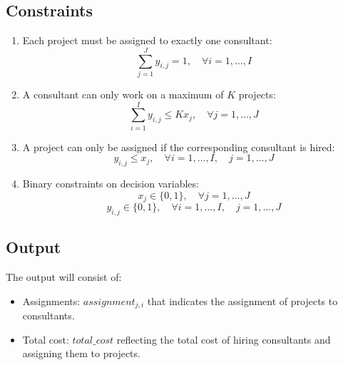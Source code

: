 \documentclass{article}
\begin{document}
\subsection*{Constraints}
\begin{enumerate}
    \item Each project must be assigned to exactly one consultant:
    \[
    \sum_{j=1}^{J} y_{i,j} = 1, \quad \forall i = 1, \ldots, I
    \]

    \item A consultant can only work on a maximum of $K$ projects:
    \[
    \sum_{i=1}^{I} y_{i,j} \leq K x_j, \quad \forall j = 1, \ldots, J
    \]

    \item A project can only be assigned if the corresponding consultant is hired:
    \[
    y_{i,j} \leq x_j, \quad \forall i = 1, \ldots, I, \quad j = 1, \ldots, J
    \]

    \item Binary constraints on decision variables:
    \[
    x_j \in \{0, 1\}, \quad \forall j = 1, \ldots, J
    \]
    \[
    y_{i,j} \in \{0, 1\}, \quad \forall i = 1, \ldots, I, \quad j = 1, \ldots, J
    \]
\end{enumerate}

\subsection*{Output}
The output will consist of:
\begin{itemize}
    \item Assignments: $assignment_{j,i}$ that indicates the assignment of projects to consultants.
    \item Total cost: $total\_cost$ reflecting the total cost of hiring consultants and assigning them to projects.
\end{itemize}
\end{document}
